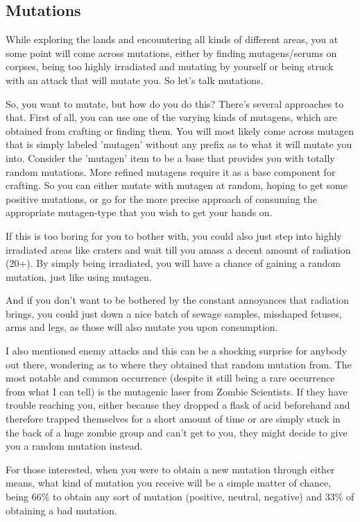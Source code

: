 \subsection{Mutations}

While exploring the lands and encountering all kinds of different areas, you at some point will come across mutations, either by finding mutagens/serums on corpses, being too highly irradiated and mutating by yourself or being struck with an attack that will mutate you. So let's talk mutations.

So, you want to mutate, but how do you do this?
There's several approaches to that. First of all, you can use one of the varying kinds of mutagens, which are obtained from crafting or finding them. You will most likely come across mutagen that is simply labeled 'mutagen' without any prefix as to what it will mutate you into. Consider the 'mutagen' item to be a base that provides you with totally random mutations. More refined mutagens require it as a base component for crafting. So you can either mutate with mutagen at random, hoping to get some positive mutations, or go for the more precise approach of consuming the appropriate mutagen-type that you wish to get your hands on.

If this is too boring for you to bother with, you could also just step into highly irradiated areas like craters and wait till you amass a decent amount of radiation (20+). By simply being irradiated, you will have a chance of gaining a random mutation, just like using mutagen.

And if you don't want to be bothered by the constant annoyances that radiation brings, you could just down a nice batch of sewage samples, misshaped fetuses, arms and legs, as those will also mutate you upon consumption.

I also mentioned enemy attacks and this can be a shocking surprise for anybody out there, wondering as to where they obtained that random mutation from. The most notable and common occurrence (despite it still being a rare occurrence from what I can tell) is the mutagenic laser from Zombie Scientists. If they have trouble reaching you, either because they dropped a flask of acid beforehand and therefore trapped themselves for a short amount of time or are simply stuck in the back of a huge zombie group and can't get to you, they might decide to give you a random mutation instead.

For those interested, when you were to obtain a new mutation through either means, what kind of mutation you receive will be a simple matter of chance, being 66\% to obtain any sort of mutation (positive, neutral, negative) and 33\% of obtaining a bad mutation.


